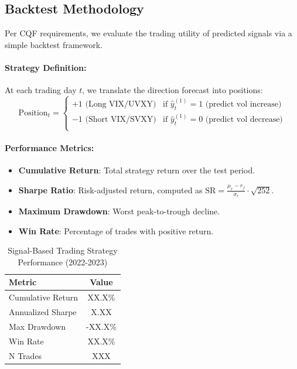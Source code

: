 \documentclass[11pt, a4paper]{article}
\begin{document}
\subsection{Backtest Methodology}
Per CQF requirements, we evaluate the trading utility of predicted signals 
via a simple backtest framework.
\paragraph{Strategy Definition:}
At each trading day $t$, we translate the direction forecast into positions:
\begin{equation}
    \text{Position}_t = 
    \begin{cases}
        +1 \text{ (Long VIX/UVXY)} & \text{if } \hat{y}_t^{(1)} = 1 \text{ (predict vol increase)} \\
        -1 \text{ (Short VIX/SVXY)} & \text{if } \hat{y}_t^{(1)} = 0 \text{ (predict vol decrease)} \\
    \end{cases}
\end{equation}
\paragraph{Performance Metrics:}
\begin{itemize}
    \item \textbf{Cumulative Return}: Total strategy return over the test period.
    \item \textbf{Sharpe Ratio}: Risk-adjusted return, computed as 
    $\text{SR} = \frac{\mu_r - r_f}{\sigma_r} \cdot \sqrt{252}$.
    \item \textbf{Maximum Drawdown}: Worst peak-to-trough decline.
    \item \textbf{Win Rate}: Percentage of trades with positive return.
\end{itemize}
\begin{table}[h]
\centering
\caption{Signal-Based Trading Strategy Performance (2022-2023)}
\begin{tabular}{lc}
\toprule
Metric & Value \\
\midrule
Cumulative Return & XX.X\% \\
Annualized Sharpe & X.XX \\
Max Drawdown      & -XX.X\% \\
Win Rate          & XX.X\% \\
N Trades          & XXX \\
\bottomrule
\end{tabular}
\label{tab:backtest}
\end{table}
\end{document}
